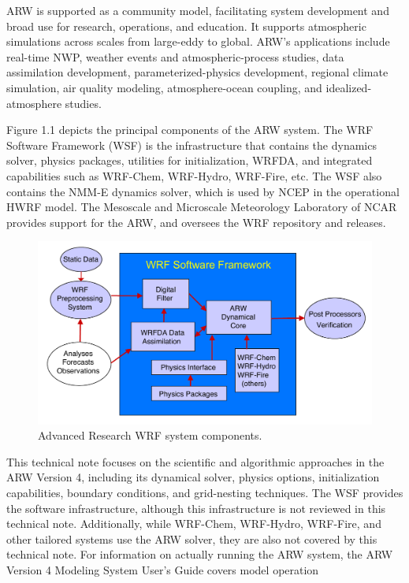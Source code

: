 ARW is supported as a community model, facilitating system development
and broad use for research, operations, and education.  It supports  
atmospheric simulations across scales from large-eddy to global.  
ARW's applications include real-time NWP, weather events and 
atmospheric-process studies, data assimilation development, 
parameterized-physics development, regional climate simulation, air 
quality modeling, atmosphere-ocean coupling, and idealized-atmosphere studies.  

Figure 1.1 depicts the principal components of the ARW system. 
The WRF Software Framework (WSF) is the infrastructure 
that contains the dynamics solver, physics packages, utilities
for initialization, WRFDA, and integrated capabilities such as WRF-Chem, WRF-Hydro, WRF-Fire, etc.  
The WSF also contains the NMM-E dynamics solver, which is used by NCEP in the operational HWRF model.
The Mesoscale and Microscale Meteorology Laboratory of NCAR provides
support for the ARW, and oversees the WRF repository and releases.

%
%
\begin{figure}
  \centering
  \includegraphics[width=6.5in]{figures/component.pdf}
  \caption{\label{figure:1}Advanced Research WRF system components.}
\end{figure}

This technical note focuses on the scientific and algorithmic 
approaches in the ARW Version 4, including its dynamical solver, physics options,
initialization capabilities, boundary conditions, and grid-nesting techniques.  
The WSF provides the software infrastructure, although this infrastructure is not 
reviewed in this technical note. 
Additionally, while WRF-Chem, WRF-Hydro, WRF-Fire, and other tailored systems 
use the ARW solver, they are also 
not covered by this technical note.  For information on 
actually running the ARW system, the ARW Version 4 Modeling System User's Guide
covers model operation
 
